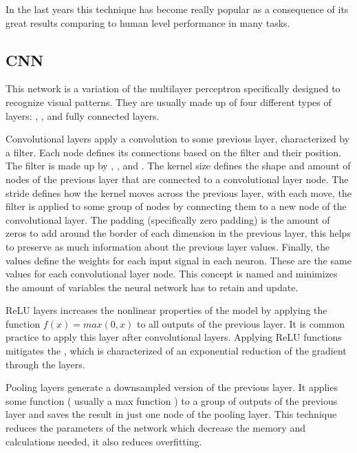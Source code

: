 In the last years this technique has become really popular as a consequence of its great results comparing to human level performance in many tasks.

\subsection{\acl{CNN} \label{subsec:CNN}}

This network is a variation of the multilayer perceptron specifically designed to recognize visual patterns.
They are usually made up of four different types of layers: , ,
 and fully connected layers.

Convolutional layers apply a convolution to some previous layer, characterized by a filter.
Each node defines its connections based on the filter and their position. The filter is made up by ,
,  and .
The kernel size defines the shape and amount of nodes of the previous layer that are connected to a convolutional layer node.
The stride defines how the kernel moves across the previous layer, with each move, the filter is applied to some group of
nodes by connecting them to a new node of the convolutional layer.
The padding (specifically zero padding) is the amount of zeros to add around the border of each dimension in the previous
layer, this helps to preserve as much information about the previous layer values.
Finally, the values define the weights for each input signal in each neuron.
These are the same values for each convolutional layer node.
This concept is named  and minimizes the amount
of variables the neural network has to retain and update.

\ac{ReLU} layers increases the nonlinear properties of the model by applying the function $f(x)=max(0,x)$ to all outputs of the previous layer.
It is common practice to apply this layer after convolutional layers.
Applying \ac{ReLU} functions mitigates the , which is characterized of an exponential
reduction of the gradient through the layers.

Pooling layers generate a downsampled version of the previous layer.
It applies some function ( usually a max function ) to a group of outputs of the previous layer and saves the result in
just one node of the pooling layer.
This technique reduces the parameters of the network which decrease the memory and calculations needed, it also reduces overfitting.

